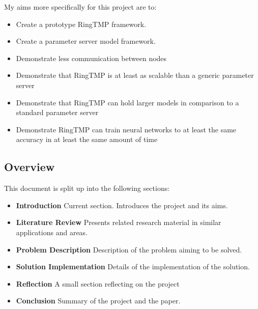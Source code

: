 My aims more specifically for this project are to:
\begin{itemize}
    \item Create a prototype RingTMP framework.
    \item Create a parameter server model framework.
    \item Demonstrate less communication between nodes
    \item Demonstrate that RingTMP is at least as scalable than a generic parameter
    server
    \item Demonstrate that RingTMP can hold larger models in comparison to a
    standard parameter server
    \item Demonstrate RingTMP can train neural networks to at least the same
    accuracy in at least the same amount of time
\end{itemize}

\subsection{Overview}
This document is split up into the following sections:
\begin{itemize}
 \item \textbf{Introduction} Current section. Introduces the project and its aims.
 \item \textbf{Literature Review} Presents related research material in similar applications and areas.
 \item \textbf{Problem Description} Description of the problem aiming to be solved.
 \item \textbf{Solution Implementation} Details of the implementation of the solution.
 \item \textbf{Reflection} A small section reflecting on the project
 \item \textbf{Conclusion} Summary of the project and the paper.
\end{itemize}





